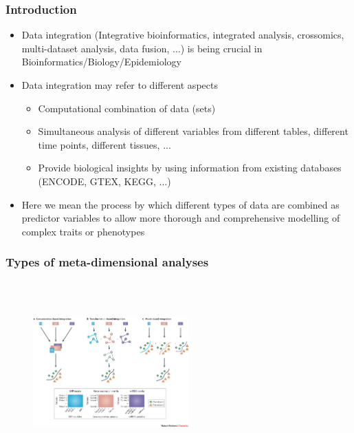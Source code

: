 \documentclass[10pt,xcolor=dvipsnames]{beamer}\usepackage[]{graphicx}\usepackage[]{color}
\begin{document}
\begin{frame}[plain]\frametitle{Introduction}

\begin{itemize}
\item Data integration (Integrative bioinformatics, integrated
analysis, crossomics, multi-dataset analysis, data fusion, ...) is being crucial in Bioinformatics/Biology/Epidemiology
\item Data integration may refer to different aspects
  \begin{itemize}
   \item Computational combination of data (sets)
   \item Simultaneous analysis of different variables from different tables, different time points, different tissues, ...
   \item Provide biological insights by using information from existing databases (ENCODE, GTEX, KEGG, ...)
  \end{itemize}
\item Here we mean the process by which different types of data are combined as predictor
variables to allow more thorough and comprehensive modelling of complex traits or phenotypes
\end{itemize}
\end{frame}


\begin{frame}[plain]\frametitle{Types of meta-dimensional analyses}

\begin{figure}
\begin{center}
 \includegraphics[height=7cm, width=6cm]{figures/meta_dimensional.jpg}
\end{center}
\end{figure}

\end{frame}
\end{document}
